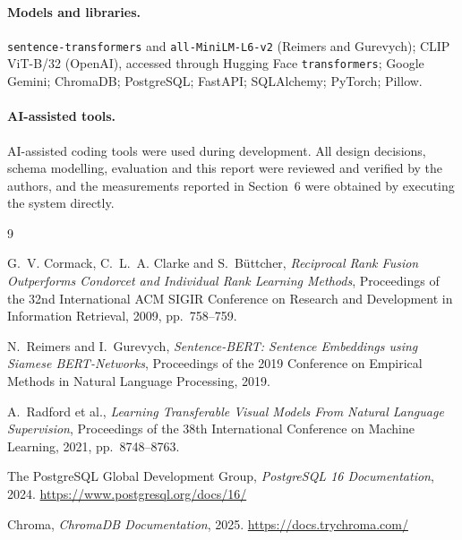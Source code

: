 \documentclass[11pt,a4paper]{article}
\begin{document}
\paragraph{Models and libraries.}
\begin{sloppypar}
\texttt{sentence-transformers} and \texttt{all-MiniLM-L6-v2} (Reimers and
Gurevych); CLIP ViT-B/32 (OpenAI), accessed through Hugging Face
\texttt{transformers}; Google Gemini; ChromaDB; PostgreSQL; FastAPI; SQLAlchemy;
PyTorch; Pillow.
\end{sloppypar}

\paragraph{AI-assisted tools.}
AI-assisted coding tools were used during development. All design decisions,
schema modelling, evaluation and this report were reviewed and verified by the
authors, and the measurements reported in Section~6 were obtained by executing
the system directly.

\begin{thebibliography}{9}

G.~V. Cormack, C.~L.~A. Clarke and S.~B\"uttcher,
\emph{Reciprocal Rank Fusion Outperforms Condorcet and Individual Rank Learning
Methods}, Proceedings of the 32nd International ACM SIGIR Conference on Research
and Development in Information Retrieval, 2009, pp.~758--759.

N.~Reimers and I.~Gurevych,
\emph{Sentence-BERT: Sentence Embeddings using Siamese BERT-Networks},
Proceedings of the 2019 Conference on Empirical Methods in Natural Language
Processing, 2019.

A.~Radford et al.,
\emph{Learning Transferable Visual Models From Natural Language Supervision},
Proceedings of the 38th International Conference on Machine Learning, 2021,
pp.~8748--8763.

The PostgreSQL Global Development Group,
\emph{PostgreSQL 16 Documentation}, 2024.
\url{https://www.postgresql.org/docs/16/}

Chroma, \emph{ChromaDB Documentation}, 2025. \url{https://docs.trychroma.com/}

\end{thebibliography}
\end{document}
